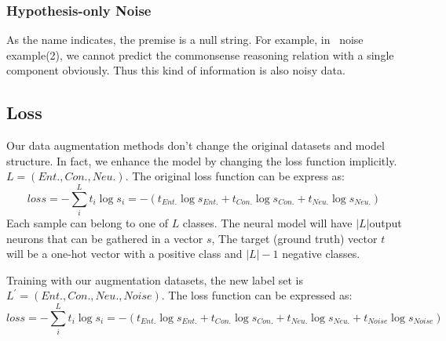 \subsubsection{Hypothesis-only Noise}

As the name indicates, the premise is a null string. For example, in~ 
noise example(2), we cannot predict the commonsense reasoning relation with a single component obviously. 
Thus this kind of information is also noisy data. 

\subsection{Loss}
\label{sec:loss}
Our data augmentation methods don't change the original datasets and model structure. 
In fact, we enhance the model by changing the loss function implicitly. $L=(Ent., Con., Neu.)$.
The original loss function can be express as:
 \begin{equation}
 	loss = -\sum_{i}^{L}t_{i}\log s_{i}=-\left ( t_{Ent.}\log s_{Ent.} + t_{Con.}\log s_{Con.} +  t_{Neu.}\log s_{Neu.}\right )
\end{equation}
Each sample can belong to one of  $L$ classes.
 The neural model will have $|L|$output neurons that can be gathered in a vector $s$, 
The target (ground truth) vector $t$ will be a one-hot vector with a positive class and $|L|-1$ negative classes.

Training with our augmentation datasets, the new label set is $L^{'}=(Ent., Con., Neu., Noise)$. The loss function can be expressed as:
 \begin{equation}
 loss = -\sum_{i}^{L}t_{i}\log s_{i}=-\left ( t_{Ent.}\log s_{Ent.} + t_{Con.}\log s_{Con.} +  t_{Neu.}\log s_{Neu.} +  t_{Noise}\log s_{Noise}\right )
\end{equation}

















